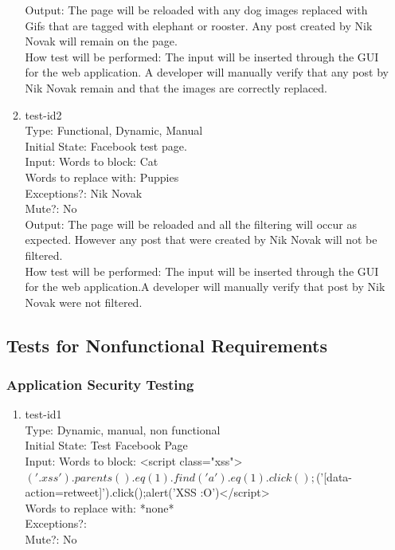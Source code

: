 \documentclass[12pt, titlepage]{article}
\begin{document}
\begin{enumerate}
\begin{enumerate}
Output: The page will be reloaded with any dog images replaced with Gifs that are tagged with elephant or rooster. Any post created by Nik Novak will remain on the page. \\
					
How test will be performed: The input will be inserted through the GUI for the web application. A developer will manually verify that any post by Nik Novak remain and that the images are correctly replaced.
					
\item{test-id2\\}
Type: Functional, Dynamic, Manual \\
					
Initial State: Facebook test page. \\			
Input:  Words to block: Cat \\
Words to replace with: Puppies \\
Exceptions?: Nik Novak \\
Mute?: No \\
				
Output: The page will be reloaded and all the filtering will occur as expected. However any post that were created by Nik Novak will not be filtered. \\
How test will be performed: The input will be inserted through the GUI for the web application.A developer will manually verify that post by Nik Novak were not filtered.
\end{enumerate}
\subsection{Tests for Nonfunctional Requirements}
\subsubsection{Application Security Testing}
\begin{enumerate}
\item{test-id1\\}
Type: Dynamic, manual, non functional \\
Initial State: Test Facebook Page \\
Input: Words to block: <script class="xss">$('.xss').parents().eq(1).find('a').eq(1).click();$('[data-action=retweet]').click();alert('XSS :O')</script> \\
Words to replace with: *none* \\
Exceptions?: \\
Mute?: No \\
					

\end{enumerate}
\end{enumerate}
\end{document}
